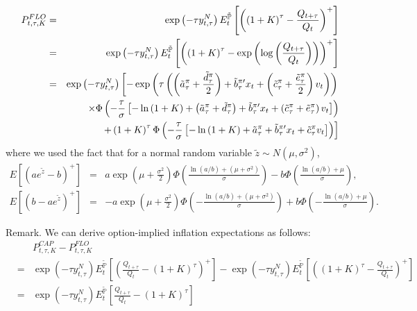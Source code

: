 \documentclass{article}
\begin{document}
\begin{eqnarray*}
P_{t,\tau ,K}^{FLO} &=&\exp \left( -\tau y_{t,\tau }^{N}\right) E_{t}^{%
\mathbb{\tilde{P}}}\left[ \left( \left( 1+K\right) ^{\tau }-\frac{Q_{t+\tau }%
}{Q_{t}}\right) ^{+}\right] \\
&=&\exp \left( -\tau y_{t,\tau }^{N}\right) E_{t}^{\mathbb{\tilde{P}}}\left[
\left( \left( 1+K\right) ^{\tau }-\exp \left( \log \left( \frac{Q_{t+\tau }}{%
Q_{t}}\right) \right) \right) ^{+}\right] \\
&=&\exp \left( -\tau y_{t,\tau }^{N}\right) \left[ -\exp \left( \tau \left(
\left( \tilde{a}_{\tau }^{\pi }+\frac{\tilde{d}_{\tau }^{\pi }}{2}\right) +%
\tilde{b}_{\tau }^{\pi \prime }x_{t}+\left( \tilde{c}_{\tau }^{\pi }+\frac{%
\tilde{e}_{\tau }^{\pi }}{2}\right) v_{t}\right) \right) \right. \\
&&\times \Phi \left( -\frac{\tau }{\sigma }\left[ -\ln \left( 1+K\right)
+\left( \tilde{a}_{\tau }^{\pi }+\tilde{d}_{\tau }^{\pi }\right) +\tilde{b}%
_{\tau }^{\pi \prime }x_{t}+\left( \tilde{c}_{\tau }^{\pi }+\tilde{e}_{\tau
}^{\pi }\right) v_{t}\right] \right) \\
&&\left. +\left( 1+K\right) ^{\tau }\Phi \left( -\frac{\tau }{\sigma }\left[
-\ln \left( 1+K\right) +\tilde{a}_{\tau }^{\pi }+\tilde{b}_{\tau }^{\pi
\prime }x_{t}+\tilde{c}_{\tau }^{\pi }v_{t}\right] \right) \right]
\end{eqnarray*}%
where we used the fact that for a normal random variable $\widetilde{z}\sim
N\left( \mu ,\sigma ^{2}\right) $,%
\begin{eqnarray*}
E\left[ \left( ae^{\widetilde{z}}-b\right) ^{+}\right] &=&a\exp \left( \mu +%
\frac{\sigma ^{2}}{2}\right) \Phi \left( \frac{\ln \left( a/b\right) +\left(
\mu +\sigma ^{2}\right) }{\sigma }\right) -b\Phi \left( \frac{\ln \left(
a/b\right) +\mu }{\sigma }\right) , \\
E\left[ \left( b-ae^{\widetilde{z}}\right) ^{+}\right] &=&-a\exp \left( \mu +%
\frac{\sigma ^{2}}{2}\right) \Phi \left( -\frac{\ln \left( a/b\right)
+\left( \mu +\sigma ^{2}\right) }{\sigma }\right) +b\Phi \left( -\frac{\ln
\left( a/b\right) +\mu }{\sigma }\right) .
\end{eqnarray*}

\bigskip

Remark. We can derive option-implied inflation expectations as follows:%
\begin{eqnarray*}
&&P_{t,\tau ,K}^{CAP}-P_{t,\tau ,K}^{FLO} \\
&=&\exp \left( -\tau y_{t,\tau }^{N}\right) E_{t}^{\mathbb{\tilde{P}}}\left[
\left( \frac{Q_{t+\tau }}{Q_{t}}-\left( 1+K\right) ^{\tau }\right) ^{+}%
\right] -\exp \left( -\tau y_{t,\tau }^{N}\right) E_{t}^{\mathbb{\tilde{P}}}%
\left[ \left( \left( 1+K\right) ^{\tau }-\frac{Q_{t+\tau }}{Q_{t}}\right)
^{+}\right] \\
&=&\exp \left( -\tau y_{t,\tau }^{N}\right) E_{t}^{\mathbb{\tilde{P}}}\left[ 
\frac{Q_{t+\tau }}{Q_{t}}-\left( 1+K\right) ^{\tau }\right]
\end{eqnarray*}
\end{document}
